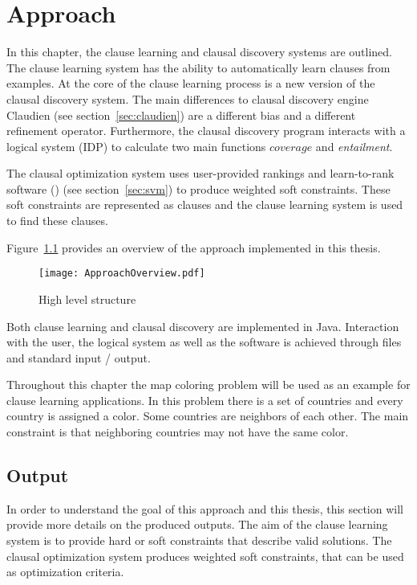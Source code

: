 \chapter{Approach}
\label{cha:meth}

In this chapter, the clause learning and clausal discovery systems are outlined.
The clause learning system has the ability to automatically learn clauses from examples.
At the core of the clause learning process is a new version of the clausal discovery system.
The main differences to clausal discovery engine Claudien (see section~\ref{sec:claudien}) are a different bias and a different refinement operator.
Furthermore, the clausal discovery program interacts with a logical system (IDP) to calculate two main functions $\mathit{coverage}$ and \textit{entailment}.

The clausal optimization system uses user-provided rankings and learn-to-rank software (\svm) (see section~\ref{sec:svm}) to produce weighted soft constraints.
These soft constraints are represented as clauses and the clause learning system is used to find these clauses.

Figure~\ref{fig:high_level_structure} provides an overview of the approach implemented in this thesis.

\begin{figure}

	\caption{High level structure}
	\centering
		\texttt{[image: ApproachOverview.pdf]}
	\label{fig:high_level_structure}

\end{figure}

Both clause learning and clausal discovery are implemented in Java.
Interaction with the user, the logical system as well as the  software is achieved through files and standard input / output.

Throughout this chapter the map coloring problem will be used as an example for clause learning applications.
In this problem there is a set of countries and every country is assigned a color.
Some countries are neighbors of each other.
The main constraint is that neighboring countries may not have the same color.

\section{Output}
In order to understand the goal of this approach and this thesis, this section will provide more details on the produced outputs.
The aim of the clause learning system is to provide hard or soft constraints that describe valid solutions.
The clausal optimization system produces weighted soft constraints, that can be used as optimization criteria.

